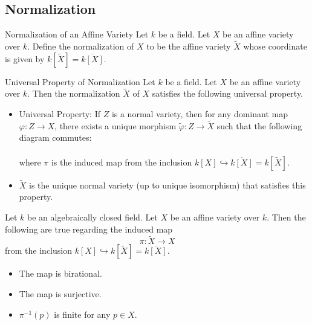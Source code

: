 \documentclass[a4paper]{article}
\begin{document}
\subsection{Normalization}
\begin{defn}{Normalization of an Affine Variety}{} Let $k$ be a field. Let $X$ be an affine variety over $k$. Define the normalization of $X$ to be the affine variety $\widetilde{X}$ whose coordinate is given by $k[\widetilde{X}]=\overline{k[X]}$. 
\end{defn}

\begin{prp}{Universal Property of Normalization}{} Let $k$ be a field. Let $X$ be an affine variety over $k$. Then the normalization $\widetilde{X}$ of $X$ satisfies the following universal property. 
\begin{itemize}
\item Universal Property: If $Z$ is a normal variety, then for any dominant map $\varphi:Z\to X$, there exists a unique morphism $\widetilde{\varphi}:Z\to\widetilde{X}$ such that the following diagram commutes: \\
\\
where $\pi$ is the induced map from the inclusion $k[X]\hookrightarrow\overline{k[X]}=k[\widetilde{X}]$. 
\item $\widetilde{X}$ is the unique normal variety (up to unique isomorphism) that satisfies this property. 
\end{itemize}
\end{prp}

\begin{prp}{}{} Let $k$ be an algebraically closed field. Let $X$ be an affine variety over $k$. Then the following are true regarding the induced map $$\pi:\widetilde{X}\to X$$ from the inclusion $k[X]\hookrightarrow k[\widetilde{X}]=\overline{k[X]}$. 
\begin{itemize}
\item The map is birational. 
\item The map is surjective. 
\item $\pi^{-1}(p)$ is finite for any $p\in X$. 
\end{itemize}
\end{prp}
\end{document}
